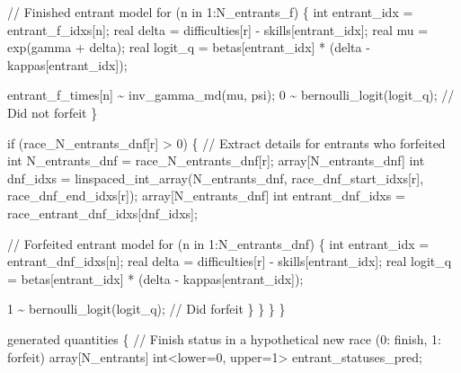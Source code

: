 \documentclass[
  letterpaper,
  DIV=11,
  numbers=noendperiod]{scrartcl}
\newenvironment{Shaded}{\begin{snugshade}}{\end{snugshade}}
\newcommand{\CommentTok}[1]{\textcolor[rgb]{0.37,0.37,0.37}{#1}}
\newcommand{\ControlFlowTok}[1]{\textcolor[rgb]{0.00,0.23,0.31}{#1}}
\newcommand{\DataTypeTok}[1]{\textcolor[rgb]{0.68,0.00,0.00}{#1}}
\newcommand{\DecValTok}[1]{\textcolor[rgb]{0.68,0.00,0.00}{#1}}
\newcommand{\KeywordTok}[1]{\textcolor[rgb]{0.00,0.23,0.31}{#1}}
\newcommand{\NormalTok}[1]{\textcolor[rgb]{0.00,0.23,0.31}{#1}}
\begin{document}
\begin{codelisting}
\begin{Shaded}
\begin{Highlighting}[]
    \CommentTok{// Finished entrant model}
    \ControlFlowTok{for}\NormalTok{ (n }\ControlFlowTok{in} \DecValTok{1}\NormalTok{:N\_entrants\_f) \{}
      \DataTypeTok{int}\NormalTok{ entrant\_idx = entrant\_f\_idxs[n];}
      \DataTypeTok{real}\NormalTok{ delta = difficulties[r] {-} skills[entrant\_idx];}
      \DataTypeTok{real}\NormalTok{ mu = exp(gamma + delta);}
      \DataTypeTok{real}\NormalTok{ logit\_q = betas[entrant\_idx] * (delta {-} kappas[entrant\_idx]);}

\NormalTok{      entrant\_f\_times[n] \textasciitilde{} inv\_gamma\_md(mu, psi);}
      \DecValTok{0}\NormalTok{ \textasciitilde{} bernoulli\_logit(logit\_q); }\CommentTok{// Did not forfeit}
\NormalTok{    \}}

    \ControlFlowTok{if}\NormalTok{ (race\_N\_entrants\_dnf[r] \textgreater{} }\DecValTok{0}\NormalTok{) \{}
      \CommentTok{// Extract details for entrants who forfeited}
      \DataTypeTok{int}\NormalTok{ N\_entrants\_dnf = race\_N\_entrants\_dnf[r];}
      \DataTypeTok{array}\NormalTok{[N\_entrants\_dnf]}
        \DataTypeTok{int}\NormalTok{ dnf\_idxs = linspaced\_int\_array(N\_entrants\_dnf,}
\NormalTok{                                           race\_dnf\_start\_idxs[r],}
\NormalTok{                                           race\_dnf\_end\_idxs[r]);}
      \DataTypeTok{array}\NormalTok{[N\_entrants\_dnf]}
        \DataTypeTok{int}\NormalTok{ entrant\_dnf\_idxs = race\_entrant\_dnf\_idxs[dnf\_idxs];}

      \CommentTok{// Forfeited entrant model}
      \ControlFlowTok{for}\NormalTok{ (n }\ControlFlowTok{in} \DecValTok{1}\NormalTok{:N\_entrants\_dnf) \{}
        \DataTypeTok{int}\NormalTok{ entrant\_idx = entrant\_dnf\_idxs[n];}
        \DataTypeTok{real}\NormalTok{ delta = difficulties[r] {-} skills[entrant\_idx];}
        \DataTypeTok{real}\NormalTok{ logit\_q = betas[entrant\_idx] * (delta {-} kappas[entrant\_idx]);}

        \DecValTok{1}\NormalTok{ \textasciitilde{} bernoulli\_logit(logit\_q); }\CommentTok{// Did forfeit}
\NormalTok{      \}}
\NormalTok{    \}}
\NormalTok{  \}}
\NormalTok{\}}

\KeywordTok{generated quantities}\NormalTok{ \{}
  \CommentTok{// Finish status in a hypothetical new race (0: finish, 1: forfeit)}
  \DataTypeTok{array}\NormalTok{[N\_entrants] }\DataTypeTok{int}\NormalTok{\textless{}}\KeywordTok{lower}\NormalTok{=}\DecValTok{0}\NormalTok{, }\KeywordTok{upper}\NormalTok{=}\DecValTok{1}\NormalTok{\textgreater{} entrant\_statuses\_pred;}


\end{Highlighting}
\end{Shaded}
\end{codelisting}
\end{document}
